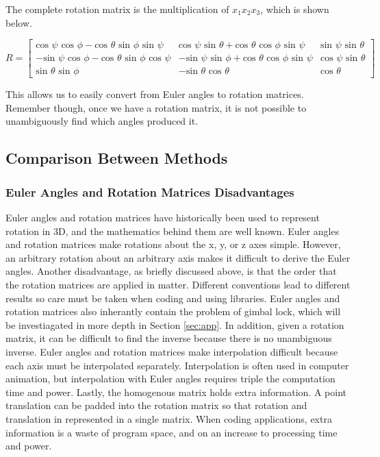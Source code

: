 The complete rotation matrix is the multiplication of $x_1x_2x_3$, which is shown below.

$$
R =
\begin{bmatrix}
\text{cos }\psi \text{ cos }\phi- \text{cos }\theta \text{ sin }\phi \text{ sin }\psi & \text{cos } \psi \text{ sin }\theta + \text{cos }\theta \text{ cos }\phi \text{ sin }\psi & \text{sin }\psi \text{ sin }\theta \\
-\text{sin }\psi \text{ cos }\phi - \text{cos }\theta \text{ sin }\phi \text{ cos }\psi & - \text{sin }\psi \text{ sin }\phi + \text{cos }\theta \text{ cos }\phi \text{ sin }\psi & \text{cos }\psi \text{ sin }\theta \\
\text{sin }\theta \text{ sin }\phi & - \text{sin }\theta \text{ cos }\theta & \text{cos } \theta
\end{bmatrix}
$$

This allows us to easily convert from Euler angles to rotation matrices.
Remember though, once we have a rotation matrix, it is not possible to unambiguously find which angles produced it.


\subsection{Comparison Between Methods}
\subsubsection{Euler Angles and Rotation Matrices Disadvantages}
Euler angles and rotation matrices have historically been used to represent rotation in 3D, and the mathematics behind them are well known.
Euler angles and rotation matrices make rotations about the x, y, or z axes simple.
However, an arbitrary rotation about an arbitrary axis makes it difficult to derive the Euler angles.
Another disadvantage, as briefly discussed above, is that the order that the rotation matrices are applied in matter.
Different conventions lead to different results so care must be taken when coding and using libraries.
Euler angles and rotation matrices also inherantly contain the problem of gimbal lock, which will be investiagated in more depth in Section \ref{sec:app}.
In addition, given a rotation matrix, it can be difficult to find the inverse because there is no unambiguous inverse.
Euler angles and rotation matrices make interpolation difficult because each axis must be interpolated separately.
Interpolation is often used in computer animation, but interpolation with Euler angles requires triple the computation time and power.
Lastly, the homogenous matrix holds extra information.
A point translation can be padded into the rotation matrix so that rotation and translation in represented in a single matrix.
When coding applications, extra information is a waste of program space, and on an increase to processing time and power.
